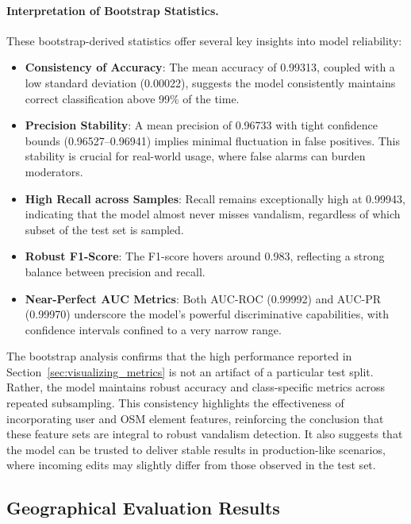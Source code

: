 \documentclass[
    13pt, %
    a4paper, %
    listof=totoc, %
    bibliography=totoc, %
    index=totoc, %
    headsepline
]{scrreprt}
\begin{document}
\paragraph{Interpretation of Bootstrap Statistics.}
These bootstrap-derived statistics offer several key insights into model reliability:

\begin{itemize}
    \item \textbf{Consistency of Accuracy}: The mean accuracy of 0.99313, coupled with a low standard deviation (0.00022), suggests the model consistently maintains correct classification above 99\% of the time.
    \item \textbf{Precision Stability}: A mean precision of 0.96733 with tight confidence bounds (0.96527--0.96941) implies minimal fluctuation in false positives. This stability is crucial for real-world usage, where false alarms can burden moderators.
    \item \textbf{High Recall across Samples}: Recall remains exceptionally high at 0.99943, indicating that the model almost never misses vandalism, regardless of which subset of the test set is sampled.
    \item \textbf{Robust F1-Score}: The F1-score hovers around 0.983, reflecting a strong balance between precision and recall.
    \item \textbf{Near-Perfect AUC Metrics}: Both AUC-ROC (0.99992) and AUC-PR (0.99970) underscore the model’s powerful discriminative capabilities, with confidence intervals confined to a very narrow range.
\end{itemize}

\noindent The bootstrap analysis confirms that the high performance reported in Section~\ref{sec:visualizing_metrics} is not an artifact of a particular test split. Rather, the model maintains robust accuracy and class-specific metrics across repeated subsampling. This consistency highlights the effectiveness of incorporating user and OSM element features, reinforcing the conclusion that these feature sets are integral to robust vandalism detection. It also suggests that the model can be trusted to deliver stable results in production-like scenarios, where incoming edits may slightly differ from those observed in the test set.

\subsection{Geographical Evaluation Results}
\label{sec:geo_eval_best_model}
\end{document}
